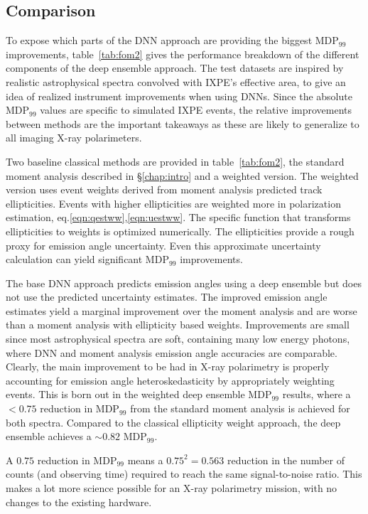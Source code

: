 \subsection{Comparison}
To expose which parts of the DNN approach are providing the biggest MDP$_{99}$ improvements, table~\ref{tab:fom2} gives the performance breakdown of the different components of the deep ensemble approach. The test datasets are inspired by realistic astrophysical spectra convolved with IXPE's effective area, to give an idea of realized instrument improvements when using DNNs. Since the absolute MDP$_{99}$ values are specific to simulated IXPE events, the relative improvements between methods are the important takeaways as these are likely to generalize to all imaging X-ray polarimeters.

Two baseline classical methods are provided in table~\ref{tab:fom2}, the standard moment analysis described in \S\ref{chap:intro} and a weighted version. The weighted version uses event weights derived from moment analysis predicted track ellipticities. Events with higher ellipticities are weighted more in polarization estimation, eq.\ref{eqn:qestww},\ref{eqn:uestww}. The specific function that transforms ellipticities to weights is optimized numerically. The ellipticities provide a rough proxy for emission angle uncertainty. Even this approximate uncertainty calculation can yield significant MDP$_{99}$ improvements.

The base DNN approach predicts emission angles using a deep ensemble but does not use the predicted uncertainty estimates. The improved emission angle estimates yield a marginal improvement over the moment analysis and are worse than a moment analysis with ellipticity based weights. Improvements are small since most astrophysical spectra are soft, containing many low energy photons, where DNN and moment analysis emission angle accuracies are comparable. Clearly, the main improvement to be had in X-ray polarimetry is properly accounting for emission angle heteroskedasticity by appropriately weighting events. This is born out in the weighted deep ensemble MDP$_{99}$ results, where a $< 0.75$ reduction in MDP$_{99}$ from the standard moment analysis is achieved for both spectra. Compared to the classical ellipticity weight approach, the deep ensemble achieves a $\sim 0.82$ MDP$_{99}$.

A $0.75$ reduction in MDP$_{99}$ means a $0.75^2 = 0.563$ reduction in the number of counts (and observing time) required to reach the same signal-to-noise ratio. This makes a lot more science possible for an X-ray polarimetry mission, with no changes to the existing hardware.


